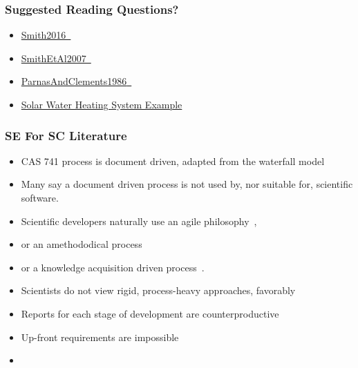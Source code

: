\documentclass[t,12pt,numbers,fleqn]{beamer}
\begin{document}
\begin{frame}
\frametitle{Suggested Reading Questions?}

\begin {itemize}

\item
  \href{https://gitlab.cas.mcmaster.ca/smiths/cas741/blob/master/ReferenceMaterial/SoftEngForScienceBook.pdf}
  {Smith2016~\cite{Smith2016}}
\item
  \href{https://gitlab.cas.mcmaster.ca/smiths/cas741/blob/master/ReferenceMaterial/SmithLaiAndKhedri2007fulltext.pdf}
  {SmithEtAl2007~\cite{SmithEtAl2007}}
\item
  \href{https://gitlab.cas.mcmaster.ca/smiths/cas741/blob/master/ReferenceMaterial/ParnasAndClements1986.pdf}
  {{ParnasAndClements1986}~\cite{ParnasAndClements1986}}
\item \href{https://github.com/smiths/swhs}{Solar Water Heating System Example}

\end{itemize}

\end{frame}


\begin{frame}
\frametitle{SE For SC Literature}

\begin {itemize}

\item CAS 741 process is document driven, adapted
from the waterfall model~\cite{GhezziEtAl2003, VanVliet2000}
\item Many say a document driven process is not used by, nor suitable for,
scientific software.
\bi
\item Scientific developers naturally use an agile
  philosophy~\cite{AckroydEtAl2008, CarverEtAl2007, EasterbrookAndJohns2009, Segal2005}, 
\item or an amethododical process~\cite{Kelly2013}
\item or a knowledge acquisition driven process~\cite{Kelly2015}.
\ei
\item Scientists do not view rigid, process-heavy approaches,
  favorably~\cite{CarverEtAl2007}
\item Reports for each stage of development are counterproductive~\cite[p.~373]{Roache1998}
\item Up-front requirements are
impossible~\cite{CarverEtAl2007, SegalAndMorris2008}
\item {}
\end{itemize}

\end{frame}
\end{document}

